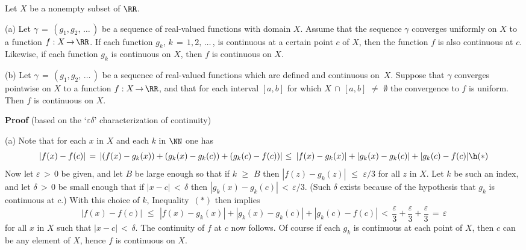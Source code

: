 \V

        Let $X$ be a nonempty subset of ${\RR}$.

\V

        (a) Let ${\gamma} \,=\, (g_{1},g_{2},\,{\ldots}\,)$
    be a sequence of real-valued functions with domain $X$. Assume that the sequence ${\gamma}$ converges uniformly on $X$ to a function $f:X \,{\rightarrow}\, {\RR}$.
    If each function $g_{k}$, $k \,=\, 1,2,\,{\ldots}\,$, is continuous at a certain point $c$ of $X$,
    then the function $f$ is also continuous at $c$.
    Likewise, if each function $g_{k}$ is continuous on $X$, then $f$ is continuous on $X$.


\V

        (b) Let ${\gamma} \,=\, (g_{1},g_{2},\,{\ldots}\,)$ be a sequence of real-valued functions which are defined and continuous on~$X$.
    Suppose that ${\gamma}$ converges pointwise on $X$ to a function $f:X \,{\rightarrow}\, {\RR}$,
    and that for each interval $[a,b]$ for which $X\,{\cap}\,[a,b] \,\,{\neq}\,\, {\emptyset}$ the convergence to $f$ is uniform.
    Then $f$ is continuous on $X$.

\V

        {\bf Proof} (based on the `${\varepsilon}{\delta}$' characterization of continuity)

\V

        (a) Note that for each $x$ in $X$ and each $k$ in ${\NN}$ one has
        \begin{displaymath}
        |f(x) - f(c)| \,=\, |(f(x) - g_{k}(x)) + (g_{k}(x) - g_{k}(c)) + (g_{k}(c) - f(c))|
    \,\,{\leq}\,\
        |f(x) - g_{k}(x)| + |g_{k}(x) - g_{k}(c)| + |g_{k}(c) - f(c)| \h ({\ast})
        \end{displaymath}
    Now let ${\varepsilon}\,>\,0$ be given, and let $B$ be large enough so that if $k\,\,{\geq}\,\,B$ then $|f(z)-g_{k}(z)|\,\,{\leq}\,\,{\varepsilon}/3$ for all $z$ in $X$.
    Let $k$ be such an index, and let ${\delta}\,>\,0$ be small enough that if $|x-c|\,<\,{\delta}$ then $|g_{k}(x)-g_{k}(c)|\,<\,{\varepsilon}/3$.
    (Such ${\delta}$ exists because of the hypothesis that $g_{k}$ is continuous at $c$.)
    With this choice of $k$, Inequality~$({\ast})$ then implies
        \begin{displaymath}
        |f(x) - f(c)|\,\,{\leq}\,\
        |f(x) - g_{k}(x)| + |g_{k}(x) - g_{k}(c)| + |g_{k}(c) - f(c)|\,<\,
    \frac{{\varepsilon}}{3} + \frac{{\varepsilon}}{3} + \frac{{\varepsilon}}{3} \,=\, {\varepsilon}
        \end{displaymath}
        for all $x$ in $X$ such that $|x-c|\,<\,{\delta}$.
    The continuity of $f$ at $c$ now follows.
    Of course if each $g_{k}$ is continuous at each point of $X$, then $c$ can be any element of $X$, hence $f$ is continuous on $X$.

